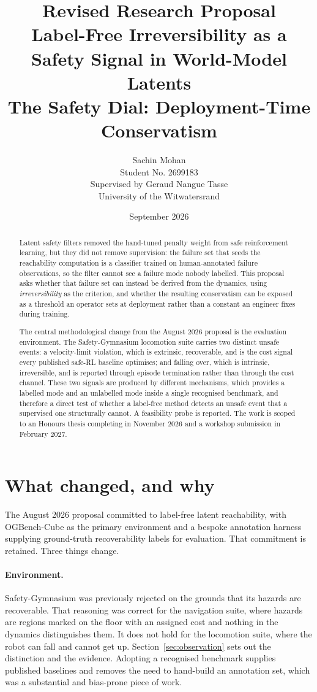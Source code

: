 \documentclass[11pt,a4paper]{article}
\title{Revised Research Proposal\\[0.5em]
  \large Label-Free Irreversibility as a Safety Signal in World-Model Latents\\[0.3em]
  \large The Safety Dial: Deployment-Time Conservatism}
\author{Sachin Mohan \\ Student No. 2699183 \\
  Supervised by Geraud Nangue Tasse \\ University of the Witwatersrand}
\date{September 2026}
\begin{document}
\maketitle

\begin{abstract}
Latent safety filters removed the hand-tuned penalty weight from safe reinforcement
learning, but they did not remove supervision: the failure set that seeds the reachability
computation is a classifier trained on human-annotated failure observations, so the filter
cannot see a failure mode nobody labelled. This proposal asks whether that failure set can
instead be derived from the dynamics, using \emph{irreversibility} as the criterion, and
whether the resulting conservatism can be exposed as a threshold an operator sets at
deployment rather than a constant an engineer fixes during training.

The central methodological change from the August 2026 proposal is the evaluation
environment. The Safety-Gymnasium locomotion suite carries two distinct unsafe events: a
velocity-limit violation, which is extrinsic, recoverable, and is the cost signal every
published safe-RL baseline optimises; and falling over, which is intrinsic, irreversible,
and is reported through episode termination rather than through the cost channel. These two
signals are produced by different mechanisms, which provides a labelled mode and an
unlabelled mode inside a single recognised benchmark, and therefore a direct test of whether
a label-free method detects an unsafe event that a supervised one structurally cannot. A
feasibility probe is reported. The work is scoped to an Honours thesis completing in
November 2026 and a workshop submission in February 2027.
\end{abstract}

\section{What changed, and why}

The August 2026 proposal committed to label-free latent reachability, with OGBench-Cube as
the primary environment and a bespoke annotation harness supplying ground-truth
recoverability labels for evaluation. That commitment is retained. Three things change.

\paragraph{Environment.} Safety-Gymnasium was previously rejected on the grounds that its
hazards are recoverable. That reasoning was correct for the navigation suite, where hazards
are regions marked on the floor with an assigned cost and nothing in the dynamics
distinguishes them. It does not hold for the locomotion suite, where the robot can fall and
cannot get up. Section~\ref{sec:observation} sets out the distinction and the evidence.
Adopting a recognised benchmark supplies published baselines and removes the need to
hand-build an annotation set, which was a substantial and bias-prone piece of work.
\end{document}
